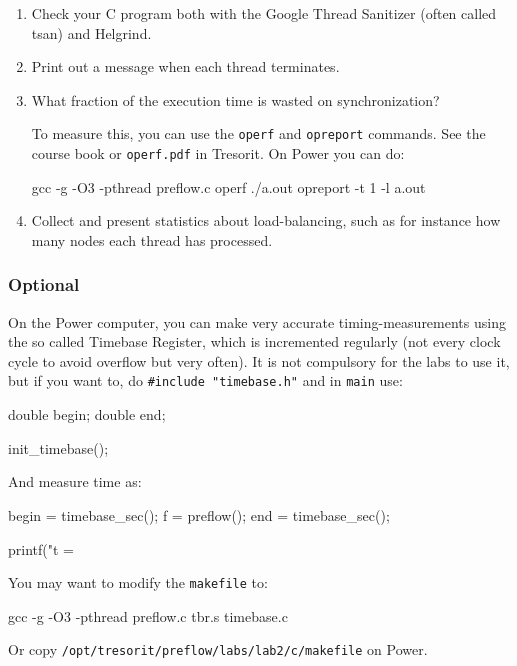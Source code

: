 \documentclass{forsete}
\begin{document}
{\begin{enumerate}
\item Check your C program both with
the Google Thread Sanitizer (often called tsan) and Helgrind. 

\item Print out a message when each thread terminates.

\item What fraction of the execution time is wasted on synchronization?

To measure this, you can use the \verb.operf. and \verb.opreport. commands. See the course book or
\verb!operf.pdf! in Tresorit. On Power you can do:
\begin{ccode}
gcc -g -O3 -pthread preflow.c
operf ./a.out
opreport -t 1 -l a.out
\end{ccode}

\item Collect and present statistics about load-balancing, such as
for instance how many nodes each thread has processed.
\end{enumerate}

\subsubsection*{Optional}
On the Power computer, you can make very accurate timing-measurements using the so called Timebase Register, 
which is incremented regularly (not every clock cycle to avoid overflow but very often).
It is not compulsory for the labs to use it, but if you want to, do \verb!#include "timebase.h"! and in \verb.main. use: 
\begin{ccode}
	double		begin;
	double		end;

        init_timebase();
\end{ccode}
And measure time as:
\begin{ccode}
	begin = timebase_sec();
        f = preflow();
        end = timebase_sec();

        printf("t = %
\end{ccode}
You may want to modify the \verb.makefile. to:
\begin{ccode}
gcc -g -O3 -pthread preflow.c tbr.s timebase.c
\end{ccode}
Or copy \verb!/opt/tresorit/preflow/labs/lab2/c/makefile! on Power.

}
\end{document}
